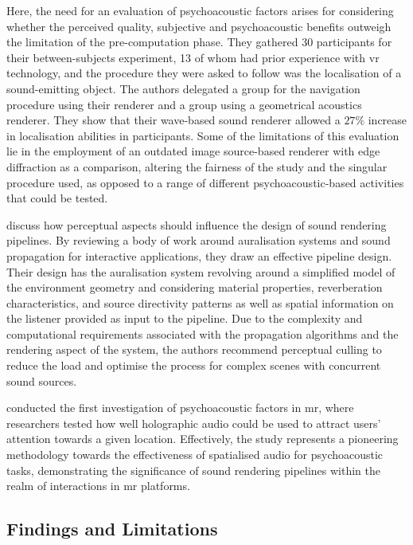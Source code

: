 Here, the need for an evaluation of psychoacoustic factors arises for considering whether the perceived quality, subjective and psychoacoustic benefits outweigh the limitation of the pre-computation phase. They gathered 30 participants for their between-subjects experiment, 13 of whom had prior experience with \acrshort{vr} technology, and the procedure they were asked to follow was the localisation of a sound-emitting object. The authors delegated a group for the navigation procedure using their renderer and a group using a geometrical acoustics renderer. They show that their wave-based sound renderer allowed a $27\%$ increase in localisation abilities in participants. Some of the limitations of this evaluation lie in the employment of an outdated image source-based renderer with edge diffraction as a comparison, altering the fairness of the study and the singular procedure used, as opposed to a range of different psychoacoustic-based activities that could be tested.\par

\cite{hacihabiboglu2017perceptual} discuss how perceptual aspects should influence the design of sound rendering pipelines. By reviewing a body of work around auralisation systems and sound propagation for interactive applications, they draw an effective pipeline design. Their design has the auralisation system revolving around a simplified model of the environment geometry and considering material properties, reverberation characteristics, and source directivity patterns as well as spatial information on the listener provided as input to the pipeline. Due to the complexity and computational requirements associated with the propagation algorithms and the rendering aspect of the system, the authors recommend perceptual culling to reduce the load and optimise the process for complex scenes with concurrent sound sources.\par

\cite{holographic_localisation} conducted the first investigation of psychoacoustic factors in \acrshort{mr}, where researchers tested how well holographic audio could be used to attract users' attention towards a given location. Effectively, the study represents a pioneering methodology towards the effectiveness of spatialised audio for psychoacoustic tasks, demonstrating the significance of sound rendering pipelines within the realm of interactions in \acrshort{mr} platforms.\par

\subsection{Findings and Limitations}


